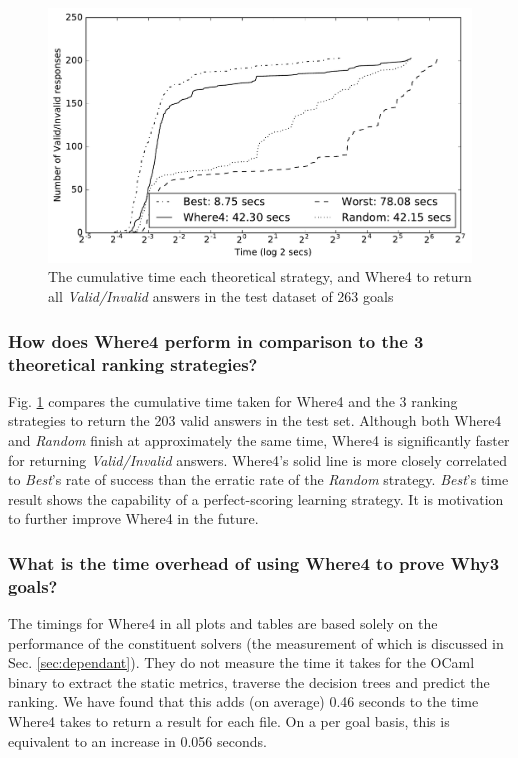 \documentclass[runningheads,a4paper]{llncs}
\begin{document}
\begin{figure}
\centering
\includegraphics[width=0.8\linewidth]{line_graph_eval_provers}
\caption{The cumulative time each theoretical strategy, and \textsf{Where4} to return all \textit{Valid/Invalid} answers in the test dataset of 263 goals}
\label{fig:line_graph_eval_provers}
\end{figure}

\subsubsection*{How does \textsf{Where4} perform in comparison to the 3 theoretical ranking strategies?}
Fig. \ref{fig:line_graph_eval_provers} compares the cumulative time taken for \textsf{Where4} and the 3 ranking strategies to return the 203 valid answers in the test set. Although both \textsf{Where4} and \textit{Random} finish at approximately the same time, \textsf{Where4} is significantly faster for returning \textit{Valid/Invalid} answers. \textsf{Where4}'s solid line is more closely correlated to \textit{Best}'s rate of success than the erratic rate of the \textit{Random} strategy. \textit{Best}'s time result shows the capability of a perfect-scoring learning strategy. It is motivation to further improve \textsf{Where4} in the future.   

\subsubsection*{What is the time overhead of using \textsf{Where4} to prove \textsf{Why3} goals?}The timings for \textsf{Where4} in all plots and tables are based solely on the performance of the constituent solvers (the measurement of which is discussed in Sec. \ref{sec:dependant}). They do not measure the time it takes for the OCaml binary to extract the static metrics, traverse the decision trees and predict the ranking. We have found that this adds (on average) 0.46 seconds to the time \textsf{Where4} takes to return a result for each file. On a per goal basis, this is equivalent to an increase in 0.056 seconds. 
\end{document}
